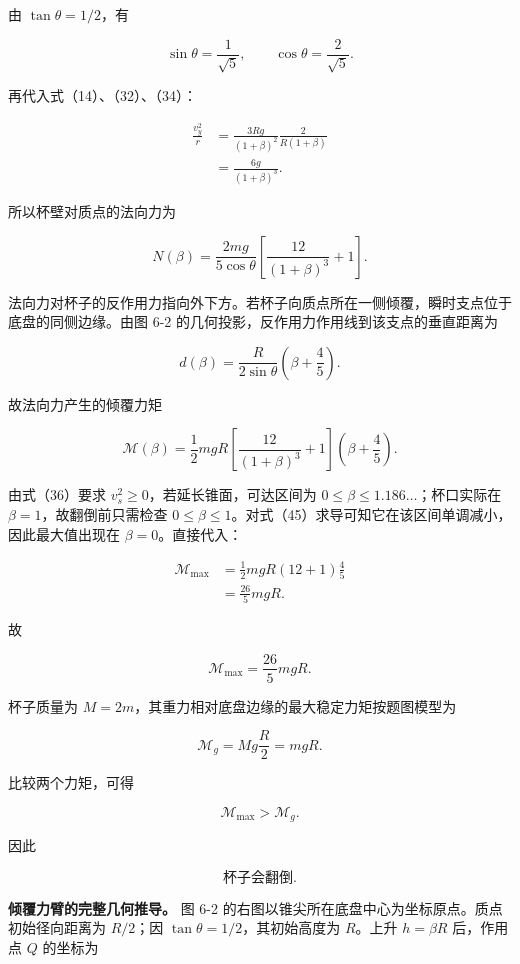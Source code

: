 \documentclass[12pt,a4paper,UTF8]{ctexart}
\begin{document}
由 \(\tan\theta=1/2\)，有

\[
\sin\theta=\frac1{\sqrt5},
\qquad
\cos\theta=\frac2{\sqrt5}.
\tag{41}
\]

再代入式（14）、（32）、（34）：

\[
\begin{aligned}
\frac{v_y^2}{r}
&=\frac{3Rg}{(1+\beta)^2}
\frac{2}{R(1+\beta)}\\
&=\frac{6g}{(1+\beta)^3}.
\end{aligned}
\tag{42}
\]

所以杯壁对质点的法向力为

\[
\boxed{
N(\beta)
=\frac{2mg}{5\cos\theta}
\left[
\frac{12}{(1+\beta)^3}+1
\right]
}.
\tag{43}
\]

法向力对杯子的反作用力指向外下方。若杯子向质点所在一侧倾覆，瞬时支点位于底盘的同侧边缘。由图
6-2 的几何投影，反作用力作用线到该支点的垂直距离为

\[
d(\beta)
=\frac{R}{2\sin\theta}
\left(\beta+\frac45\right).
\tag{44}
\]

故法向力产生的倾覆力矩

\[
\mathcal M(\beta)
=\frac12mgR
\left[
\frac{12}{(1+\beta)^3}+1
\right]
\left(\beta+\frac45\right).
\tag{45}
\]

由式（36）要求 \(v_s^2\ge0\)，若延长锥面，可达区间为
\(0\le\beta\le1.186\ldots\)；杯口实际在 \(\beta=1\)，故翻倒前只需检查
\(0\le\beta\le1\)。对式（45）求导可知它在该区间单调减小，因此最大值出现在
\(\beta=0\)。直接代入：

\[
\begin{aligned}
\mathcal M_{\max}
&=\frac12mgR(12+1)\frac45\\
&=\frac{26}{5}mgR.
\end{aligned}
\tag{46}
\]

故

\[
\boxed{
\mathcal M_{\max}=\frac{26}{5}mgR
}.
\tag{47}
\]

杯子质量为 \(M=2m\)，其重力相对底盘边缘的最大稳定力矩按题图模型为

\[
\mathcal M_g=Mg\frac R2=mgR.
\tag{48}
\]

比较两个力矩，可得

\[
\mathcal M_{\max}>\mathcal M_g.
\tag{49}
\]

因此

\[
\boxed{\text{杯子会翻倒}}.
\tag{50}
\]

\textbf{倾覆力臂的完整几何推导。} 图 6-2
的右图以锥尖所在底盘中心为坐标原点。质点初始径向距离为 \(R/2\)；因
\(\tan\theta=1/2\)，其初始高度为 \(R\)。上升 \(h=\beta R\) 后，作用点
\(Q\) 的坐标为
\end{document}
